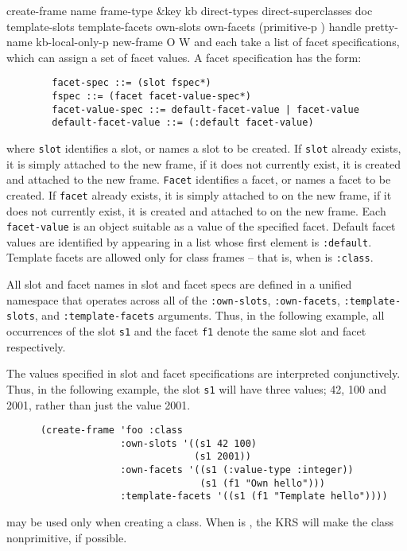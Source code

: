 \begin{okbcop}{create-frame}{ name frame-type \&key kb direct-types direct-superclasses doc template-slots template-facets own-slots own-facets (primitive-p \true) handle pretty-name kb-local-only-p} { new-frame } { O } { W } {  }
    and  each take a list of facet 
   specifications, which can assign a set of facet values.  A facet
   specification has the form:
   \begin{verbatim}
        facet-spec ::= (slot fspec*)
        fspec ::= (facet facet-value-spec*)
        facet-value-spec ::= default-facet-value | facet-value
        default-facet-value ::= (:default facet-value)
   \end{verbatim}
   where {\tt slot} identifies a slot, or names a slot to be created.  If
   {\tt slot} already exists, it is simply attached to the new frame, if
   it does not currently exist, it is created and attached to the new frame.
   {\tt Facet} identifies a facet, or names a facet to be created.  If
   {\tt facet} already exists, it is simply attached to  on
   the new frame, if it does not currently exist, it is created and attached
   to  on the new frame.  Each {\tt facet-value} is an object
   suitable as a value of the specified facet.  Default facet values are
   identified by appearing in a list whose first element is {\tt :default}.  
   Template facets are allowed only for class frames -- that is, when
    is {\tt :class}.

   All slot and facet names in slot and facet specs are defined in a unified
   namespace that operates across all of the {\tt :own-slots},
   {\tt :own-facets}, {\tt :template-slots}, and {\tt :template-facets}
   arguments.  Thus, in the following  example, all occurrences of the slot
   {\tt s1} and the facet {\tt f1} denote the same slot and facet
   respectively.

   The values specified in slot and facet specifications are interpreted
   conjunctively.  Thus, in the following example, the slot
   {\tt s1} will have three values; 42, 100 and 2001, rather than just
   the value 2001.
   \begin{verbatim}
      (create-frame 'foo :class
                    :own-slots '((s1 42 100)
                                 (s1 2001))
                    :own-facets '((s1 (:value-type :integer))
                                  (s1 (f1 "Own hello")))
                    :template-facets '((s1 (f1 "Template hello"))))
   \end{verbatim}

    may be used only when creating a class.
   When  is \false, the KRS will make
   the class nonprimitive, if possible.


\end{okbcop}
